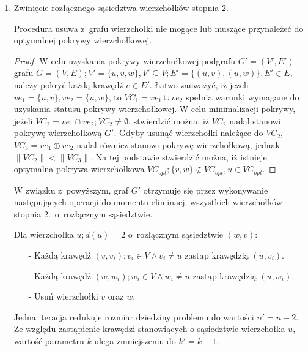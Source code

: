 \begin{enumerate}
  \item Zwinięcie rozłącznego sąsiedztwa wierzchołków stopnia 2.
    \begin{theorem}
      Procedura usuwa z~grafu wierzchołki nie mogące lub muszące przynależeć do 
      optymalnej pokrywy wierzchołkowej.
    \end{theorem}
    \begin{proof}
      W celu uzyskania pokrywy wierzchołkowej podgrafu $G\prime=(V\prime,E\prime)$
      grafu ${G=(V,E); V\prime=\{u, v, w\}, V\prime \subseteq V; E\prime=\{(u,v),
      (u,w)\}, E\prime \in E}$,
      należy pokryć każdą krawędź $e \in E\prime$. 
      Łatwo zauważyć, iż jezeli $ve_1=\{u,v\}, ve_2=\{u,w\}$, 
      to $VC_1=ve_1 \cup ve_2$ spełnia warunki wymagane do uzyskania statusu
      pokrywy wierzchołkowej.
      W celu minimalizacji pokrywy, jeżeli $VC_2=ve_1 \cap ve_2; VC_2 \neq \emptyset$,
      stwierdzić można, iż $VC_2$ nadal stanowi pokrywę wierzchołkową $G\prime$.
      Gdyby usunąć wierzchołki należące do $VC_2$, $VC_3=ve_1 \oplus ve_2$ nadal
      również stanowi pokrywę wierzchołkową, jednak $\|VC_2\| < \|VC_3\|$.
      Na tej podstawie stwierdzić można, iż istnieje optymalna pokrywa
      wierzchołkowa $VC_{opt}; \{v,w\} \notin VC_{opt}, u \in VC_{opt}$.
    \end{proof}

    W związku z~powyższym, graf $G\prime$ otrzymuje się przez wykonywanie
    następujących operacji do momentu eliminacji wszystkich wierzchołków stopnia
    2.\ o~rozłącznym sąsiedztwie.

    Dla wierzchołka $u; d(u)=2$ o~rozłącznym sąsiedztwie $(w,v)$:
    \begin{itemize}
      \item[-] Każdą krawędź $(v,v_i); v_i \in V \land v_i \neq u$ zastąp 
        krawędzią $(u, v_i)$.
      \item[-] Każdą krawędź $(w,w_i); w_i \in V \land w_i \neq u$ zastąp
        krawędzią $(u, w_i)$.
      \item[-] Usuń wierzchołki $v$ oraz $w$.
    \end{itemize}
    Jedna iteracja redukuje rozmiar dziedziny problemu do wartości
    $n\prime=n-2$.
    Ze względu zastąpienie krawędzi stanowiących o sąsiedztwie wierzchołka $u$,
    wartość parametru $k$ ulega zmniejszeniu do $k\prime=k-1$.

\end{enumerate}

